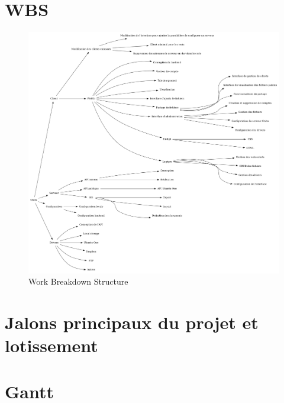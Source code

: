 \section{WBS}
\newpage
\begin{figure}[ht]
    \includegraphics[width=\textwidth,height=\textheight,keepaspectratio]{wbs.png}
    \caption{Work Breakdown Structure}
\end{figure}


\section{Jalons principaux du projet et lotissement}


\section{Gantt}